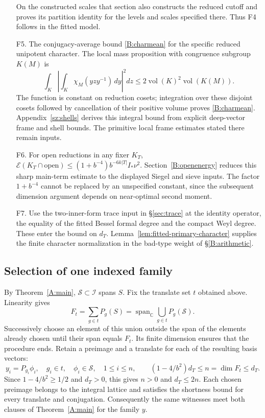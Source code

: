 \begin{enumerate}
On the constructed scales that section also constructs the reduced cutoff and proves its partition identity for the levels and scales specified there. Thus F4 follows in the fitted model.
\item[F5.] The conjugacy-average bound \eqref{B:charmean} for the
specific reduced unipotent character. The local mass proposition
with congruence subgroup \(K(M)\) is
\[\int_K\left|\int_K\chi_M(yzy^{-1})\,dy\right|^2dz
\le2\operatorname{vol}(K)^2\operatorname{vol}(K(M)).\]
The function is constant on reduction cosets; integration
over these disjoint cosets followed by cancellation of their
positive volume proves \eqref{B:charmean}. Appendix~\ref{sz:shells} derives this integral bound from explicit
deep-vector frame and shell bounds. The primitive local frame
estimates stated there remain inputs.
\item[F6.] For open reductions in any fixer \(K_T\),
\(\mathcal E(K_T\cap\mathrm{open})\le
 (1+b^{-4})b^{-6k|T|}I_*\nu^2\).
Section~\ref{B:openenergy} reduces this sharp main-term estimate to the displayed Siegel and sieve inputs. The factor
\(1+b^{-4}\) cannot be replaced by an unspecified constant,
since the subsequent dimension argument depends on near-optimal
second moment.
\item[F7.] Use the two-inner-form trace input in \S\ref{sec:trace}
at the identity operator, the equality of the fitted Bessel
formal degree and the compact Weyl degree. These enter the bound on \(d_T\).
Lemma~\ref{lem:fitted-primary-character} supplies the finite character
normalization in the bad-type weight of \S\ref{B:arithmetic}.
\end{enumerate}


\subsection{Selection of one indexed family}
\label{B:selection}
By Theorem~\ref{A:main}, \(\mathcal S\subset\mathcal I\) spans \(S\).
Fix the translate set \(t\) obtained above. Linearity gives
\[
 F_t=\sum_{g\in t}P_g(S)
 =\operatorname{span}_{\mathbb C}\bigcup_{g\in t}P_g(\mathcal S).
\]
Successively choose an element of this union outside the span of the
elements already chosen until their span equals \(F_t\). Its finite
dimension ensures that the procedure ends. Retain a preimage and a
translate for each of the resulting basis vectors:
\begin{equation}
\label{B:witnesses}
 y_i=P_{g_i}\phi_i,\quad g_i\in t,\quad \phi_i\in\mathcal S,\quad
 1\le i\le n,\qquad (1-4/b^2)d_T\le n=\dim F_t\le d_T .
\end{equation}
Since \(1-4/b^2\ge 1/2\) and \(d_T>0\), this gives \(n>0\) and
\(d_T\le2n\). Each chosen preimage belongs to the integral lattice
and satisfies the shortness bound for every translate and conjugation.
Consequently the same witnesses meet both clauses of
Theorem~\ref{A:main} for the family \(y\).
